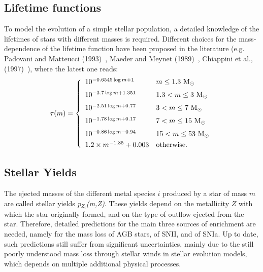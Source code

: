\documentclass[galaxies,letter,accept,moreauthors,pdftex,10pt,a4paper,usenatbib]{mdpi}
\begin{document}
\subsection{Lifetime functions}
To model the evolution of a simple stellar population, a detailed
knowledge of the lifetimes of stars with different masses is required.
Different choices for the mass-dependence of the lifetime function
have been proposed in the literature (e.g. Padovani and Matteucci
(1993)~\cite{1993ApJ...416...26P}, Maeder and Meynet
(1989)~\cite{1989A&A...210..155M}, Chiappini et al.,
(1997)~\cite{1997ApJ...477..765C}), where the latest one reads:
\begin{equation}
\tau(m)=\left\{\begin{array}{ll}
10^{ -0.6545 \log m + 1} & m \le 1.3~{\rm M}_\odot\\
\vspace{-0.2cm}&\\
10^{ -3.7 \log m + 1.351} & 1.3 < m \le 3~{\rm M}_\odot\\
\vspace{-0.2cm}&\\
10^{ -2.51 \log m + 0.77} & 3 < m \le 7~{\rm M}_\odot\\
\vspace{-0.2cm}&\\
10^{ -1.78 \log m + 0.17} & 7 < m \le 15~{\rm M}_\odot\\
\vspace{-0.2cm}&\\
10^{ -0.86 \log m - 0.94} & 15 < m \le 53~{\rm M}_\odot\\
\vspace{-0.3cm}&\\
1.2 \times m^{-1.85}+ 0.003 & {\rm otherwise.} 
\end{array} \right.
\end{equation}


\subsection{Stellar Yields}
The ejected masses of the different metal species $i$ produced by a
star of mass $m$ are called stellar yields {\it
  p$_{Z_{i}}$(m,Z)}. These yields depend on the metallicity
$Z$ with which the star originally formed, and on the type of outflow
ejected from the star.  Therefore, detailed predictions for the main
three sources of enrichment are needed, namely for the mass loss of
AGB stars, of SNII, and of SNIa. Up to date, such predictions still
suffer from significant uncertainties, mainly due to the still poorly
understood mass loss through stellar winds in stellar evolution
models, which depends on multiple additional physical processes.
\end{document}
